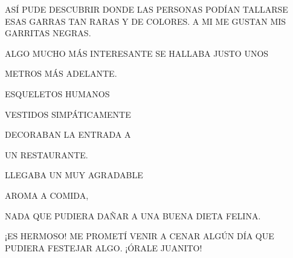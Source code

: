 \begin{flushright}
	\begin{minipage}{.5\textwidth}
		ASÍ PUDE DESCUBRIR DONDE LAS PERSONAS PODÍAN TALLARSE
		ESAS GARRAS TAN RARAS Y DE COLORES. 			
		A MI ME GUSTAN MIS GARRITAS NEGRAS.	
	\end{minipage}
\end{flushright}





\newpage
{}	
\begin{minipage}{.5\textwidth}
	ALGO MUCHO MÁS INTERESANTE SE HALLABA JUSTO
	UNOS
	
	METROS
	MÁS ADELANTE. 
	
	ESQUELETOS HUMANOS 
	
	VESTIDOS SIMPÁTICAMENTE 
	
	DECORABAN LA ENTRADA A 
	
	UN RESTAURANTE.
	
	LLEGABA UN MUY 
	AGRADABLE 
	
	AROMA A COMIDA, 
	
	NADA QUE PUDIERA DAÑAR A UNA BUENA DIETA FELINA.
	
	
	
	¡ES HERMOSO! ME PROMETÍ VENIR A CENAR ALGÚN DÍA QUE PUDIERA FESTEJAR ALGO. ¡ÓRALE JUANITO!
\end{minipage}






